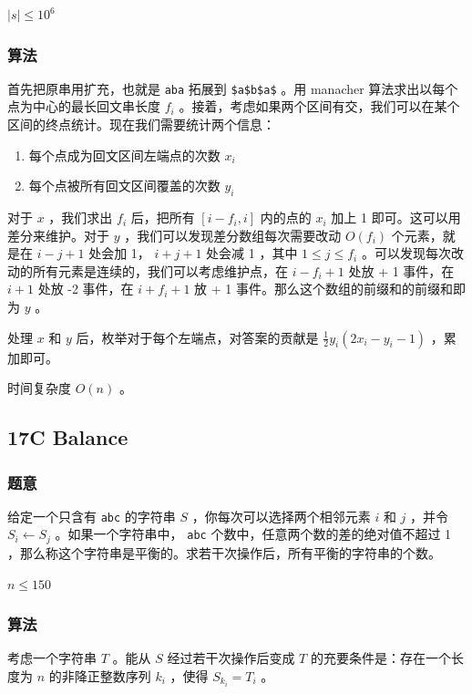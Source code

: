 \documentclass[11pt]{article}
\begin{document}
   $|s| \leq 10^6$
\subsubsection{算法}
\label{sec-1-6-2}

    首先把原串用扩充，也就是 \texttt{aba} 拓展到 \texttt{\$a\$b\$a\$} 。用 manacher 算法求出以每个点为中心的最长回文串长度 $f_i$ 。接着，考虑如果两个区间有交，我们可以在某个区间的终点统计。现在我们需要统计两个信息：
\begin{enumerate}
\item 每个点成为回文区间左端点的次数 $x_i$
\item 每个点被所有回文区间覆盖的次数 $y_i$
\end{enumerate}

   对于 $x$ ，我们求出 $f_i$ 后，把所有 $[i - f_i, i]$ 内的点的 $x_i$ 加上 1 即可。这可以用差分来维护。对于 $y$ ，我们可以发现差分数组每次需要改动 $O(f_i)$ 个元素，就是在 $i - j + 1$ 处会加 1， $i + j + 1$ 处会减 1 ，其中 $1 \leq j \leq f_i$ 。可以发现每次改动的所有元素是连续的，我们可以考虑维护点，在 $i - f_i + 1$ 处放 + 1 事件，在 $i + 1$ 处放 -2 事件，在 $i + f_i + 1$ 放 + 1 事件。那么这个数组的前缀和的前缀和即为 $y$ 。

   处理 $x$ 和 $y$ 后，枚举对于每个左端点，对答案的贡献是 $\frac{1}{2} y_i (2 x_i - y_i - 1)$ ，累加即可。

   时间复杂度 $O(n)$ 。
\subsection{17C   Balance}
\label{sec-1-7}
\subsubsection{题意}
\label{sec-1-7-1}

    给定一个只含有 \texttt{abc} 的字符串 $S$ ，你每次可以选择两个相邻元素 $i$ 和 $j$ ，并令 $S_i \leftarrow S_j$ 。如果一个字符串中， \texttt{abc} 个数中，任意两个数的差的绝对值不超过 1 ，那么称这个字符串是平衡的。求若干次操作后，所有平衡的字符串的个数。

    $n \leq 150$
\subsubsection{算法}
\label{sec-1-7-2}

    考虑一个字符串 $T$ 。能从 $S$ 经过若干次操作后变成 $T$ 的充要条件是：存在一个长度为 $n$ 的非降正整数序列 $k_i$ ，使得 $S_{k_i} = T_i$ 。
\end{document}
